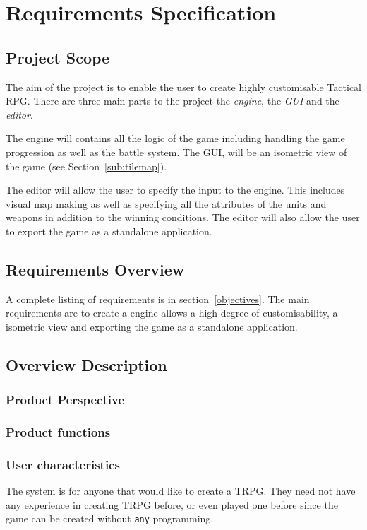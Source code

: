 \section{Requirements Specification}

\subsection{Project Scope}
\label{sub:project_scope}

The aim of the project is to enable the user to create highly customisable Tactical RPG.  There are three main parts to the project the \emph{engine}, the \emph{GUI} and the \emph{editor}.

The engine will contains all the logic of the game including handling the game progression as well as the battle system. The GUI, will be an isometric view of the game (see Section~\ref{sub:tilemap}). 

The editor will allow the user to specify the input to the engine. This includes visual map making as well as specifying all the attributes of the units and weapons in addition to the winning conditions.  The editor will also allow the user to export the game as a standalone application.

\subsection{Requirements Overview}
\label{sub:overview}
A complete listing of requirements is in section~\ref{objectives}. The main requirements are to create a engine allows a high degree of customisability, a isometric view and exporting the game as a standalone application.  

\subsection{Overview Description}
\subsubsection{Product Perspective}

\subsubsection{Product functions}

\subsubsection{User characteristics}
The system is for anyone that would like to create a TRPG.  They need not have any experience in creating TRPG before, or even played one before since the game can be created without \texttt{any} programming. 

